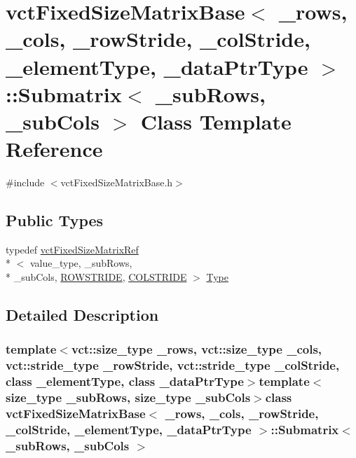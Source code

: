 \hypertarget{classvct_fixed_size_matrix_base_1_1_submatrix}{\section{vct\-Fixed\-Size\-Matrix\-Base$<$ \-\_\-rows, \-\_\-cols, \-\_\-row\-Stride, \-\_\-col\-Stride, \-\_\-element\-Type, \-\_\-data\-Ptr\-Type $>$\-:\-:Submatrix$<$ \-\_\-sub\-Rows, \-\_\-sub\-Cols $>$ Class Template Reference}
\label{classvct_fixed_size_matrix_base_1_1_submatrix}
}


{\ttfamily \#include $<$vct\-Fixed\-Size\-Matrix\-Base.\-h$>$}

\subsection*{Public Types}
\begin{DoxyCompactItemize}
\item 
typedef \hyperlink{classvct_fixed_size_matrix_ref}{vct\-Fixed\-Size\-Matrix\-Ref}\\*
$<$ value\-\_\-type, \-\_\-sub\-Rows, \\*
\-\_\-sub\-Cols, \hyperlink{classvct_fixed_size_matrix_base_a7ca4cc289d4bd697476f2d37e82e9a38a6c561939f5de9c5e815b889df7662117}{R\-O\-W\-S\-T\-R\-I\-D\-E}, \hyperlink{classvct_fixed_size_matrix_base_a7ca4cc289d4bd697476f2d37e82e9a38a920a67cbcd917bab0e46677bf43cb6b8}{C\-O\-L\-S\-T\-R\-I\-D\-E} $>$ \hyperlink{classvct_fixed_size_matrix_base_1_1_submatrix_a0159859a38f45bd4a73c8202e573b6bd}{Type}
\end{DoxyCompactItemize}


\subsection{Detailed Description}
\subsubsection*{template$<$vct\-::size\-\_\-type \-\_\-rows, vct\-::size\-\_\-type \-\_\-cols, vct\-::stride\-\_\-type \-\_\-row\-Stride, vct\-::stride\-\_\-type \-\_\-col\-Stride, class \-\_\-element\-Type, class \-\_\-data\-Ptr\-Type$>$template$<$size\-\_\-type \-\_\-sub\-Rows, size\-\_\-type \-\_\-sub\-Cols$>$class vct\-Fixed\-Size\-Matrix\-Base$<$ \-\_\-rows, \-\_\-cols, \-\_\-row\-Stride, \-\_\-col\-Stride, \-\_\-element\-Type, \-\_\-data\-Ptr\-Type $>$\-::\-Submatrix$<$ \-\_\-sub\-Rows, \-\_\-sub\-Cols $>$}

